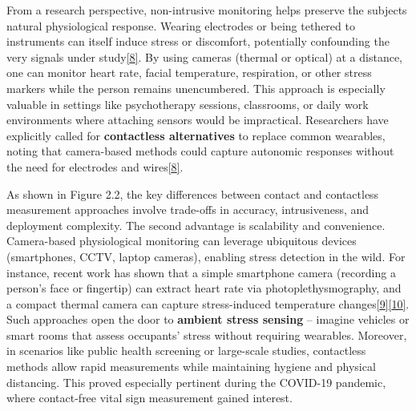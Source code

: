 \documentclass[12pt,a4paper]{article}
\begin{document}
From a research perspective, non-intrusive monitoring helps preserve the subject\textquotesingle s natural physiological response. Wearing electrodes or being tethered to instruments can itself induce stress or discomfort, potentially confounding the very signals under study\href{https://pmc.ncbi.nlm.nih.gov/articles/PMC10385045/\#:~:text=Numerous\%20studies\%20have\%20investigated\%20the,natural\%20physiological\%20responses\%20under\%20study}{{[}8{]}}. By using cameras (thermal or optical) at a distance, one can monitor heart rate, facial temperature, respiration, or other stress markers while the person remains unencumbered. This approach is especially valuable in settings like psychotherapy sessions, classrooms, or daily work environments where attaching sensors would be impractical. Researchers have explicitly called for \textbf{contactless alternatives} to replace common wearables, noting that camera-based methods could capture autonomic responses without the need for electrodes and wires\href{https://pmc.ncbi.nlm.nih.gov/articles/PMC10385045/\#:~:text=Numerous\%20studies\%20have\%20investigated\%20the,natural\%20physiological\%20responses\%20under\%20study}{{[}8{]}}.

As shown in Figure 2.2, the key differences between contact and contactless measurement approaches involve trade-offs in accuracy, intrusiveness, and deployment complexity. The second advantage is scalability and convenience. Camera-based physiological monitoring can leverage ubiquitous devices (smartphones, CCTV, laptop cameras), enabling stress detection in the wild. For instance, recent work has shown that a simple smartphone camera (recording a person's face or fingertip) can extract heart rate via photoplethysmography, and a compact thermal camera can capture stress-induced temperature changes\href{https://pubmed.ncbi.nlm.nih.gov/30964440/\#:~:text=,cheap\%2C\%20convenient\%2C\%20and\%20mobile}{{[}9{]}}\href{https://ngdc.cncb.ac.cn/openlb/publication/OLB-PM-30964440\#:~:text=camera\%20can\%20be\%20used\%20to,convenient\%2C\%20and\%20mobile\%20monitoring\%20systems}{{[}10{]}}. Such approaches open the door to \textbf{ambient stress sensing} -- imagine vehicles or smart rooms that assess occupants' stress without requiring wearables. Moreover, in scenarios like public health screening or large-scale studies, contactless methods allow rapid measurements while maintaining hygiene and physical distancing. This proved especially pertinent during the COVID-19 pandemic, where contact-free vital sign measurement gained interest.
\end{document}
